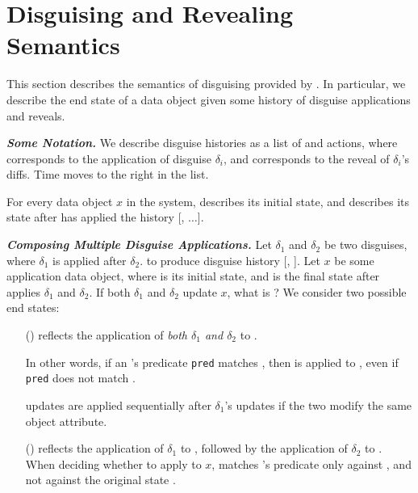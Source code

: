 \section{Disguising and Revealing Semantics}
\label{sec:comp}
This section describes the semantics of disguising provided by \sys. 
In particular, we describe the end state of a data object given some history of disguise
applications and reveals.

\vspace{6pt}\noindent\textbf{\emph{Some Notation.}} We describe disguise histories as a list of
 and  actions, where  corresponds to the application of disguise $\delta_i$, and
 corresponds to the reveal of $\delta_i$'s diffs. Time moves to the right in the list.

For every data object $x$ in the system, \xstart describes its initial state, and
 describes its state after \sys has applied the history [,
$\dots$].


\vspace{6pt}\noindent\textbf{\emph{Composing Multiple Disguise Applications.}}
Let $\delta_1$ and $\delta_2$ be two disguises, where $\delta_1$ is applied after $\delta_2$.
to produce disguise history [, ]. 
%
Let $x$ be some application data object, where \xstart is its initial state, and
 is the final state after \sys applies $\delta_1$ and $\delta_2$.
%
If both $\delta_1$ and $\delta_2$ update $x$, what is ?
We consider two possible end states: 
%
\begin{enumerate}
    \item[(\appcompone)]  reflects the application of
        \emph{both $\delta_1$ and $\delta_2$} to \xstart. 

        In other words, if an 's predicate \texttt{pred} matches \xstart, then  is
        applied to , even if \texttt{pred} does not match
        . 

     updates are applied sequentially after $\delta_1$'s updates if the two modify the
        same object attribute.

\item[(\appcomptwo)]  reflects the application of $\delta_1$ to \xstart, followed
by the application of $\delta_2$ to . When deciding whether to apply to $x$,
        \sys matches 's predicate only against
, and not against the original state \xstart.
\end{enumerate}

